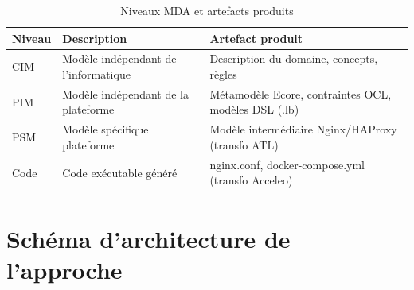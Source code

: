 \documentclass[12pt,a4paper]{report}
\begin{document}
\begin{table}[H]
\centering
\caption{Niveaux MDA et artefacts produits}
\begin{tabular}{|p{2.5cm}|p{5cm}|p{5.5cm}|}
\hline
\textbf{Niveau} & \textbf{Description} & \textbf{Artefact produit} \\
\hline
CIM & Modèle indépendant de l'informatique & Description du domaine, concepts, règles \\
\hline
PIM & Modèle indépendant de la plateforme & Métamodèle Ecore, contraintes OCL, modèles DSL (.lb) \\
\hline
PSM & Modèle spécifique plateforme & Modèle intermédiaire Nginx/HAProxy (transfo ATL) \\
\hline
Code & Code exécutable généré & nginx.conf, docker-compose.yml (transfo Acceleo) \\
\hline
\end{tabular}
\end{table}

\section{Schéma d'architecture de l'approche}
\end{document}
